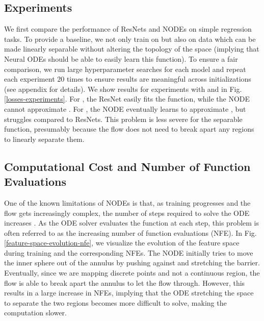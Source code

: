 \documentclass{article}
\begin{document}
\subsection{Experiments} 
We first compare the performance of ResNets and NODEs on simple regression tasks. To provide a baseline, we not only train on  but also on data which can be made linearly separable without altering the topology of the space (implying that Neural ODEs should be able to easily learn this function). To ensure a fair comparison, we run large hyperparameter searches for each model and repeat each experiment 20 times to ensure results are meaningful across initializations (see appendix for details). We show results for experiments with  and  in Fig. \ref{losses-experiments}. For , the ResNet easily fits the function, while the NODE cannot approximate . For , the NODE eventually learns to approximate , but struggles compared to ResNets. This problem is less severe for the separable function, presumably because the flow does not need to break apart any regions to linearly separate them.

\subsection{Computational Cost and Number of Function Evaluations}
One of the known limitations of NODEs is that, as training progresses and the flow gets increasingly complex, the number of steps required to solve the ODE increases \citep{chen2018neural, grathwohl2018ffjord}. As the ODE solver evaluates the function  at each step, this problem is often referred to as the increasing number of function evaluations (NFE). In Fig. \ref{feature-space-evolution-nfe}, we visualize the evolution of the feature space during training and the corresponding NFEs. The NODE initially tries to move the inner sphere out of the annulus by pushing against and stretching the barrier. Eventually, since we are mapping discrete points and not a continuous region, the flow is able to break apart the annulus to let the flow through. However, this results in a large increase in NFEs, implying that the ODE stretching the space to separate the two regions becomes more difficult to solve, making the computation slower.
\end{document}
